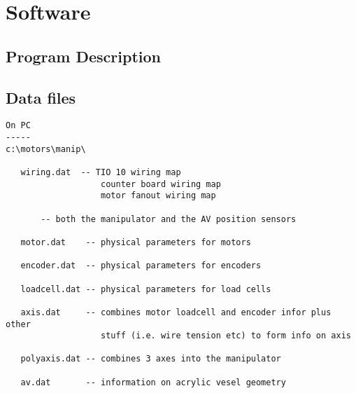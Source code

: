   
\section{Software}
  
  
\subsection{Program Description}
\subsection{Data files}
\begin{verbatim}
On PC
-----
c:\motors\manip\
  
   wiring.dat  -- TIO 10 wiring map
                   counter board wiring map
                   motor fanout wiring map
  
       -- both the manipulator and the AV position sensors
  
   motor.dat    -- physical parameters for motors
  
   encoder.dat  -- physical parameters for encoders
  
   loadcell.dat -- physical parameters for load cells
  
   axis.dat     -- combines motor loadcell and encoder infor plus other
                   stuff (i.e. wire tension etc) to form info on axis
  
   polyaxis.dat -- combines 3 axes into the manipulator
  
   av.dat       -- information on acrylic vesel geometry

\end{verbatim}

  



